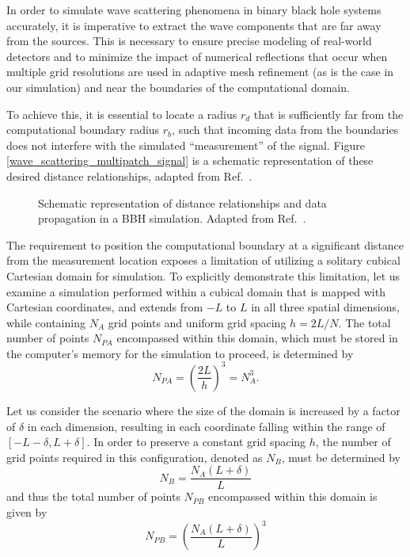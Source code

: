 In order to simulate wave scattering phenomena in binary black hole systems accurately, it is imperative to extract the wave components that are far away from the sources. This is necessary to ensure precise modeling of real-world detectors and to minimize the impact of numerical reflections that occur when multiple grid resolutions are used in adaptive mesh refinement (as is the case in our simulation) and near the boundaries of the computational domain.

To achieve this, it is essential to locate a radius $r_d$ that is sufficiently far from the computational boundary radius $r_b$, such that incoming data from the boundaries does not interfere with the simulated ``measurement'' of the signal. Figure \ref{wave_scattering_multipatch_signal} is a schematic representation of these desired distance relationships, adapted from Ref.~\cite{Reisswig2010}.

\begin{figure}[h]
  \centering
  
  \caption{Schematic representation of distance relationships and data propagation in a BBH simulation. Adapted from Ref.~\cite{Reisswig2010}.}
  \label{fig:wave_scattering_multipatch_signal}
\end{figure}

The requirement to position the computational boundary at a significant distance from the measurement location exposes a limitation of utilizing a solitary cubical Cartesian domain for simulation. To explicitly demonstrate this limitation, let us examine a simulation performed within a cubical domain that is mapped with Cartesian coordinates, and extends from $-L$ to $L$ in all three spatial dimensions, while containing $N_A$ grid points and uniform grid spacing $h=2L/N$. The total number of points $N_{PA}$ encompassed within this domain, which must be stored in the computer's memory for the simulation to proceed, is determined by
%
\begin{equation}
  N_{PA} = \left( \frac{2L}{h} \right)^3 = N_A^3.
  \label{eq:wave_scattering_npa}
\end{equation}

Let us consider the scenario where the size of the domain is increased by a factor of $\delta$ in each dimension, resulting in each coordinate falling within the range of $[-L-\delta, L+\delta]$. In order to preserve a constant grid spacing $h$, the number of grid points required in this configuration, denoted as $N_B$, must be determined by
%
\begin{equation}
  N_{B} = \frac{N_A(L + \delta)}{L}
  \label{eq:wave_scattering_npa}
\end{equation}
%
and thus the total number of points $N_{PB}$ encompassed within this domain is given by
%
\begin{equation}
  N_{PB} = \left(\frac{N_A(L + \delta)}{L}\right)^3
  \label{eq:wave_scattering_npa}
\end{equation}

